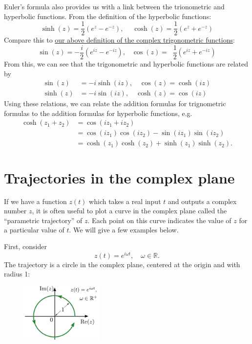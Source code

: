 \documentclass[10pt,a4paper]{article}
\begin{document}
Euler's formula also provides us with a link between the trionometric
and hyperbolic functions. From the definition of the hyperbolic
functions:
\begin{equation}
\sinh(z) = \frac{1}{2}\left(e^{z} - e^{-z}\right), \quad\;
\cosh(z) = \frac{1}{2}\left(e^{z} + e^{-z}\right)
\end{equation}
Compare this to \hyperref[complex-trigo]{our above definition of the
  complex trigonometric functions}:
\begin{equation}
\sin(z) = -\frac{i}{2}\left(e^{iz} - e^{-iz}\right), \;\;\; \cos(z) = \;\;\frac{1}{2}\left(e^{iz} + e^{-iz}\right)
\end{equation}
From this, we can see that the trigonometric and hyperbolic functions
are related by
\begin{align}
\sin(z) &= -i \sinh(iz), \quad \cos(z) = \cosh(iz) \\
\sinh(z) &= -i \sin(iz), \quad \cosh(z) = \cos(iz)
\end{align}
Using these relations, we can relate the addition formulas for
trignometric formulas to the addition formulas for hyperbolic
functions, e.g.
\begin{align}
  \cosh(z_1+z_2) &= \cos(iz_1 + iz_2) \\
  &= \cos(iz_1)\cos(iz_2) - \sin(iz_1)\sin(iz_2) \\
  &= \cosh(z_1)\cosh(z_2) + \sinh(z_1)\sinh(z_2).
\end{align}

\section{Trajectories in the complex plane}
\label{trajectories-in-the-complex-plane}

If we have a function $z(t)$ which takes a real input $t$ and outputs
a complex number $z$, it is often useful to plot a curve in the
complex plane called the ``parametric trajectory'' of $z$. Each point
on this curve indicates the value of $z$ for a particular value of
$t$. We will give a few examples below.

First, consider
\begin{equation}
  z(t) = e^{i\omega t}, \quad \omega \in \mathbb{R}.
\end{equation}
The trajectory is a circle in the complex plane, centered at the
origin and with radius 1:

\begin{figure}[h]
  \centering\includegraphics[width=0.37\textwidth]{complex_trajectory_1}
\end{figure}
\end{document}
